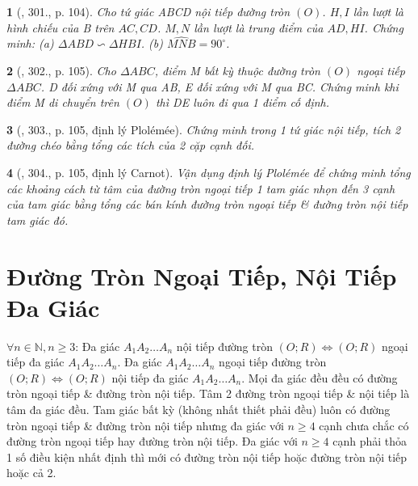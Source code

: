\documentclass{article}
\newtheorem{baitoan}{}
\begin{document}
\begin{baitoan}[\cite{Binh_Toan_9_tap_2}, 301., p. 104]
	Cho tứ giác ABCD nội tiếp đường tròn $(O)$. $H,I$ lần lượt là hình chiếu của B trên $AC,CD$. $M,N$ lần lượt là trung điểm của $AD,HI$. Chứng minh: (a) $\Delta ABD\backsim\Delta HBI$. (b) $\widehat{MNB} = 90^\circ$.
\end{baitoan}

\begin{baitoan}[\cite{Binh_Toan_9_tap_2}, 302., p. 105]
	Cho $\Delta ABC$, điểm M bất kỳ thuộc đường tròn $(O)$ ngoại tiếp $\Delta ABC$. D đối xứng với M qua AB, E đối xứng với M qua BC. Chứng minh khi điểm M di chuyển trên $(O)$ thì DE luôn đi qua 1 điểm cố định.
\end{baitoan}

\begin{baitoan}[\cite{Binh_Toan_9_tap_2}, 303., p. 105, định lý Plol\'em\'ee]
	Chứng minh trong 1 tứ giác nội tiếp, tích 2 đường chéo bằng tổng các tích của 2 cặp cạnh đối.
\end{baitoan}

\begin{baitoan}[\cite{Binh_Toan_9_tap_2}, 304., p. 105, định lý Carnot]
	Vận dụng định lý Plol\'em\'ee để chứng minh tổng các khoảng cách từ tâm của đường tròn ngoại tiếp 1 tam giác nhọn đến 3 cạnh của tam giác bằng tổng các bán kính đường tròn ngoại tiếp \& đường tròn nội tiếp tam giác đó.
\end{baitoan}


\section{Đường Tròn Ngoại Tiếp, Nội Tiếp Đa Giác}
$\forall n\in\mathbb{N},n\ge3$:  Đa giác $A_1A_2\ldots A_n$ nội tiếp đường tròn $(O;R)\Leftrightarrow(O;R)$ ngoại tiếp đa giác $A_1A_2\ldots A_n$.  Đa giác $A_1A_2\ldots A_n$ ngoại tiếp đường tròn $(O;R)\Leftrightarrow(O;R)$ nội tiếp đa giác $A_1A_2\ldots A_n$.  Mọi đa giác đều đều có đường tròn ngoại tiếp \& đường tròn nội tiếp. Tâm 2 đường tròn ngoại tiếp \& nội tiếp là tâm đa giác đều.  Tam giác bất kỳ (không nhất thiết phải đều) luôn có đường tròn ngoại tiếp \& đường tròn nội tiếp nhưng đa giác với $n\ge4$ cạnh chưa chắc có đường tròn ngoại tiếp hay đường tròn nội tiếp. Đa giác với $n\ge4$ cạnh phải thỏa 1 số điều kiện nhất định thì mới có đường tròn nội tiếp hoặc đường tròn nội tiếp hoặc cả 2.
\end{document}

